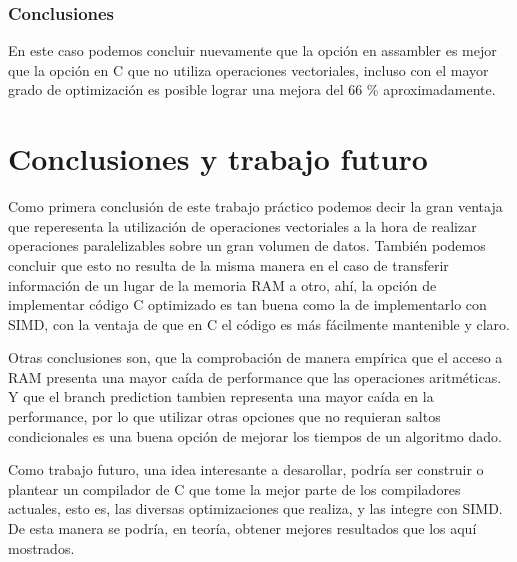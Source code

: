 \documentclass[a4paper]{article}
\begin{document}
\subsubsection{Conclusiones}

En este caso podemos concluir nuevamente que la opción en assambler es mejor que la opción en C que no utiliza operaciones vectoriales, incluso con el mayor grado de optimización es posible lograr una mejora del 66 \% aproximadamente.

\newpage
\section{Conclusiones y trabajo futuro}

Como primera conclusión de este trabajo práctico podemos decir la gran ventaja que reperesenta la utilización de operaciones vectoriales a la hora de realizar operaciones paralelizables sobre un gran volumen de datos. También podemos concluir que esto no resulta de la misma manera en el caso de transferir información de un lugar de la memoria RAM a otro, ahí, la opción de implementar código C optimizado es tan buena como la de implementarlo con SIMD, con la ventaja de que en C el código es más fácilmente mantenible y claro.

Otras conclusiones son, que la comprobación de manera empírica que el acceso a RAM presenta una mayor caída de performance que las operaciones aritméticas. Y que el branch prediction tambien representa una mayor caída en la performance, por lo que utilizar otras opciones que no requieran saltos condicionales es una buena opción de mejorar los tiempos de un algoritmo dado.

Como trabajo futuro, una idea interesante a desarollar, podría ser construir o plantear un compilador de C que tome la mejor parte de los compiladores actuales, esto es, las diversas optimizaciones que realiza, y las integre con SIMD. De esta manera se podría, en teoría, obtener mejores resultados que los aquí mostrados.
\end{document}
